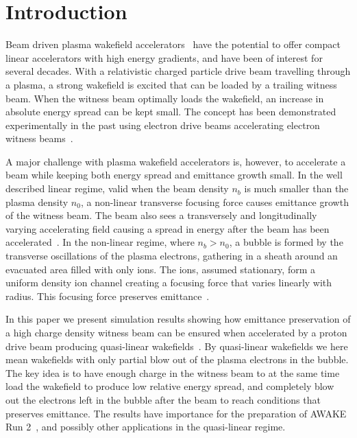 \documentclass[aps,prstab,reprint,amsmath,amssymb,groupedaddress]{revtex4-1}
\begin{document}
\maketitle

\section{Introduction}\label{S:I}

Beam driven plasma wakefield accelerators~\cite{chen:1985} have the potential to offer compact linear accelerators with
high energy gradients, and have been of interest for several decades. With a relativistic charged particle drive beam
travelling through a plasma, a strong wakefield is excited that can be loaded by a trailing witness beam. When the
witness beam optimally loads the wakefield, an increase in absolute energy spread can be kept small. The concept has
been demonstrated experimentally in the past using electron drive beams accelerating electron witness
beams~\cite{rosenzweig:1988, blumenfeld:2007, kallos:2008, litos:2014}. 

A major challenge with plasma wakefield accelerators is, however, to accelerate a beam while keeping both energy spread
and emittance growth small. In the well described linear regime, valid when the beam density $n_{b}$ is much smaller
than the plasma density $n_{0}$, a non-linear transverse focusing force causes emittance growth of the witness beam.
The beam also sees a transversely and longitudinally varying accelerating field causing a spread in energy after the
beam has been accelerated~\cite{katsouleas:1987}. In the non-linear regime, where $n_{b} > n_{0}$, a bubble is formed by
the transverse oscillations of the plasma electrons, gathering in a sheath around an evacuated area filled with only
ions. The ions, assumed stationary, form a uniform density ion channel creating a focusing force that varies linearly
with radius. This focusing force preserves emittance~\cite{rosenzweig:1991}.

In this paper we present simulation results showing how emittance preservation of a high charge density witness beam can
be ensured when accelerated by a proton drive beam producing quasi-linear wakefields~\cite{rosenzweig:2010}. By
quasi-linear wakefields we here mean wakefields with only partial blow out of the plasma electrons in the bubble.
The key idea is to have enough charge in the witness beam to at the same time load the wakefield to produce low relative
energy spread, and completely blow out the electrons left in the bubble after the beam to reach conditions that
preserves emittance. The results have importance for the preparation of AWAKE Run 2~\cite{adli:2016}, and possibly other
applications in the quasi-linear regime.
\end{document}
